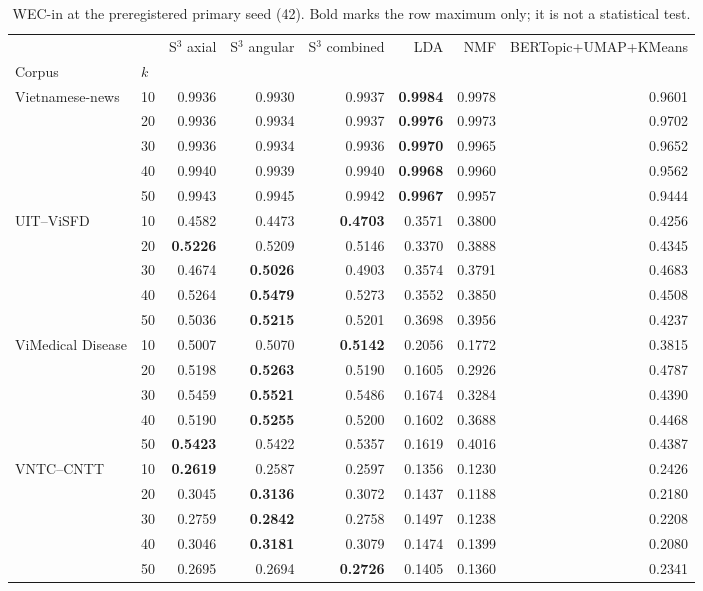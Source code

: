 \begin{table}[t]
\centering
\scriptsize
\caption{WEC-in at the preregistered primary seed (42). Bold marks the row maximum only; it is not a statistical test.}
\label{tab:cafebert-wec-in-seed42}
\begin{tabular}{llrrrrrr}
\toprule
 &  & S$^3$ axial & S$^3$ angular & S$^3$ combined & LDA & NMF & BERTopic+UMAP+KMeans \\
Corpus & $k$ &  &  &  &  &  &  \\
\midrule
\multirow[t]{5}{*}{Vietnamese-news} & 10 & 0.9936 & 0.9930 & 0.9937 & \textbf{0.9984} & 0.9978 & 0.9601 \\
 & 20 & 0.9936 & 0.9934 & 0.9937 & \textbf{0.9976} & 0.9973 & 0.9702 \\
 & 30 & 0.9936 & 0.9934 & 0.9936 & \textbf{0.9970} & 0.9965 & 0.9652 \\
 & 40 & 0.9940 & 0.9939 & 0.9940 & \textbf{0.9968} & 0.9960 & 0.9562 \\
 & 50 & 0.9943 & 0.9945 & 0.9942 & \textbf{0.9967} & 0.9957 & 0.9444 \\
\cline{1-8}
\multirow[t]{5}{*}{UIT--ViSFD} & 10 & 0.4582 & 0.4473 & \textbf{0.4703} & 0.3571 & 0.3800 & 0.4256 \\
 & 20 & \textbf{0.5226} & 0.5209 & 0.5146 & 0.3370 & 0.3888 & 0.4345 \\
 & 30 & 0.4674 & \textbf{0.5026} & 0.4903 & 0.3574 & 0.3791 & 0.4683 \\
 & 40 & 0.5264 & \textbf{0.5479} & 0.5273 & 0.3552 & 0.3850 & 0.4508 \\
 & 50 & 0.5036 & \textbf{0.5215} & 0.5201 & 0.3698 & 0.3956 & 0.4237 \\
\cline{1-8}
\multirow[t]{5}{*}{ViMedical Disease} & 10 & 0.5007 & 0.5070 & \textbf{0.5142} & 0.2056 & 0.1772 & 0.3815 \\
 & 20 & 0.5198 & \textbf{0.5263} & 0.5190 & 0.1605 & 0.2926 & 0.4787 \\
 & 30 & 0.5459 & \textbf{0.5521} & 0.5486 & 0.1674 & 0.3284 & 0.4390 \\
 & 40 & 0.5190 & \textbf{0.5255} & 0.5200 & 0.1602 & 0.3688 & 0.4468 \\
 & 50 & \textbf{0.5423} & 0.5422 & 0.5357 & 0.1619 & 0.4016 & 0.4387 \\
\cline{1-8}
\multirow[t]{5}{*}{VNTC--CNTT} & 10 & \textbf{0.2619} & 0.2587 & 0.2597 & 0.1356 & 0.1230 & 0.2426 \\
 & 20 & 0.3045 & \textbf{0.3136} & 0.3072 & 0.1437 & 0.1188 & 0.2180 \\
 & 30 & 0.2759 & \textbf{0.2842} & 0.2758 & 0.1497 & 0.1238 & 0.2208 \\
 & 40 & 0.3046 & \textbf{0.3181} & 0.3079 & 0.1474 & 0.1399 & 0.2080 \\
 & 50 & 0.2695 & 0.2694 & \textbf{0.2726} & 0.1405 & 0.1360 & 0.2341 \\
\cline{1-8}
\bottomrule
\end{tabular}

\end{table}
